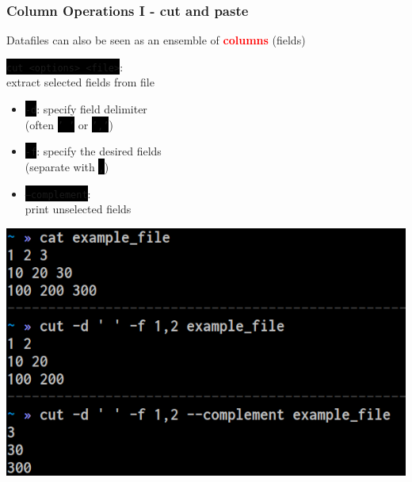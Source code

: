 \documentclass[unknownkeysallowed, 10pt, a4 paper, handout]{beamer}
\newcommand{\focus}[1]{\textbf{\textcolor{red}{#1}}}
\newcommand{\code}[1]{\colorbox{black}{\color{green}\texttt{#1}}}
\newcommand{\sidebyside}[5]{
  \begin{minipage}{#1\textwidth}
    #2
  \end{minipage} #3 \begin{minipage}{#4\textwidth}
    #5
  \end{minipage}
}
\begin{document}
\begin{frame}
  \begin{center}
    \frametitle{Column Operations I - cut and paste}

    Datafiles can also be seen as an ensemble of \focus{columns} (fields)

    \sidebyside{0.50}{
      \code{cut <options> <file>}:\\
      extract selected fields from file

      \vspace{3mm}

      \begin{itemize}
        \item \code{-d}: specify field delimiter\\
          (often \code{' '} or \code{','})
        \item \code{-f}: specify the desired fields\\
          (separate with \code{,})
        \item \code{--complement}:\\
          print unselected fields
      \end{itemize}
    }{\hfill}{0.46}{
      \begin{center}
        \includegraphics[width=1.00\textwidth]{pics/cut.png}
      \end{center}
    }

    \vspace{-4mm}


\end{center}
\end{frame}
\end{document}

